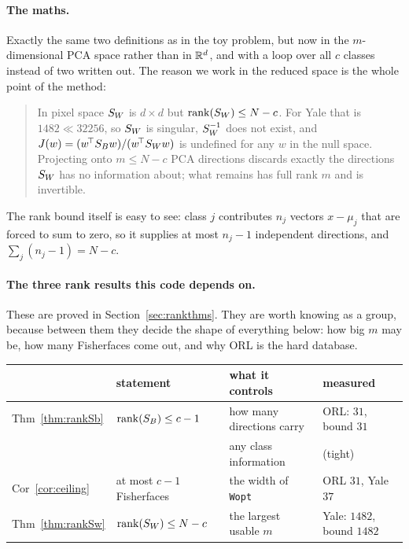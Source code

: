 \paragraph{The maths.} Exactly the same two definitions as in the toy problem,
but now in the $m$-dimensional PCA space rather than in $\mathbb{R}^d$, and with a loop
over all $c$ classes instead of two written out. The reason we work in the
reduced space is the whole point of the method:

\begin{quote}
In pixel space $S_W$ is $d\times d$ but $\operatorname{rank}(S_W) \le N - c$. For Yale that
is $1482 \ll 32256$, so $S_W$ is singular, $S_W^{-1}$ does not exist, and
$J(w) = (w^{\!\top}S_B w)/(w^{\!\top}S_W w)$ is undefined for any $w$ in the
null space. Projecting onto $m \le N-c$ PCA directions discards exactly the
directions $S_W$ has no information about; what remains has full rank $m$ and
is invertible.
\end{quote}

The rank bound itself is easy to see: class $j$ contributes $n_j$ vectors
$x - \mu_j$ that are forced to sum to zero, so it supplies at most $n_j - 1$
independent directions, and $\sum_j (n_j - 1) = N - c$.

\paragraph{The three rank results this code depends on.} These are proved in
Section~\ref{sec:rankthms}. They are worth knowing as a group, because between
them they decide the shape of everything below: how big $m$ may be, how many
Fisherfaces come out, and why ORL is the hard database.

\begin{center}
\small
\begin{tabular}{llll}
\toprule
 & statement & what it controls & measured \\
\midrule
Thm~\ref{thm:rankSb}  & $\operatorname{rank}(S_B)\le c-1$ & how many directions carry
  & ORL: $31$, bound $31$ \\
 & & any class information & (tight) \\[3pt]
Cor~\ref{cor:ceiling} & at most $c-1$ Fisherfaces & the width of \texttt{Wopt}
  & ORL $31$, Yale $37$ \\[3pt]
Thm~\ref{thm:rankSw}  & $\operatorname{rank}(S_W)\le N-c$ & the largest usable $m$
  & Yale: $1482$, bound $1482$ \\
\bottomrule
\end{tabular}
\end{center}

